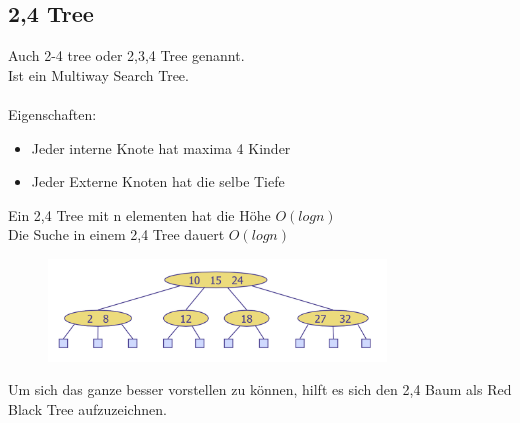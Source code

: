 \documentclass[a4paper,10pt]{report}
\begin{document}
\subsection{2,4 Tree}
Auch 2-4 tree oder 2,3,4 Tree genannt.\\
Ist ein Multiway Search Tree.\\
\\
Eigenschaften:
\begin{itemize}
	\item
		Jeder interne Knote hat maxima 4 Kinder
	\item
		Jeder Externe Knoten hat die selbe Tiefe
\end{itemize}
Ein 2,4 Tree mit n elementen hat die Höhe $O(log n)$\\
Die Suche in einem 2,4 Tree dauert $O(log n)$
\begin{figure}[H]
	\begin{center}
  		\includegraphics[width=0.8\textwidth]{img/24tree.png}
	\end{center}
\end{figure}
\noindent
Um sich das ganze besser vorstellen zu können, hilft es sich den 2,4 Baum als Red Black Tree aufzuzeichnen.
\newpage
\end{document}
